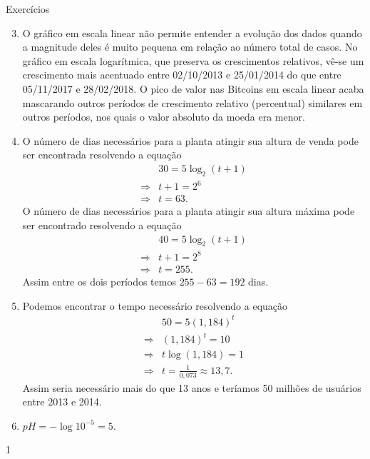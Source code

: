 \begin{answer}{Exercícios}
{\exerciselist
\begin{enumerate}\setcounter{enumi}{2}
\item O gráfico em escala linear não permite entender a evolução dos dados quando a magnitude deles é muito pequena em relação ao número total de casos. No gráfico em escala logarítmica, que preserva os crescimentos relativos, vê-se um crescimento mais acentuado entre 02/10/2013 e 25/01/2014 do que entre 05/11/2017 e 28/02/2018. O pico de valor nas Bitcoins em escala linear acaba mascarando outros períodos de crescimento relativo (percentual) similares em outros períodos, nos quais o valor absoluto da moeda era menor.
\item O número de dias necessários para a planta atingir sua altura de venda pode ser encontrada resolvendo a equação
\begin{align*}
&30 = 5\log_2 (t+1)\\
\Rightarrow &t+1 = 2^6\\
\Rightarrow &t = 63.
\end{align*}
O número de dias necessários para a planta atingir sua altura máxima pode ser encontrado resolvendo a equação
\begin{align*}
&40 = 5\log_2 (t+1)\\
\Rightarrow& t+1 = 2^8\\
\Rightarrow& t = 255.
\end{align*}
Assim entre os dois períodos temos $255-63 = 192$ dias.

\item Podemos encontrar o tempo necessário resolvendo a equação
\begin{align*}
&50 = 5(1{,}184)^t\\
\Rightarrow& (1{,}184)^t = 10\\
\Rightarrow& t\log(1{,}184) = 1\\
\Rightarrow& t = \frac{1}{0{,}073} \approx 13{,}
7.
\end{align*}
Assim seria necessário mais do que 13 anos e teríamos 50 milhões de usuários entre 2013 e 2014.

\item $pH = -\log 10^{-5}=5$.
\end{enumerate}
}{1}
\end{answer}
\clearmargin
